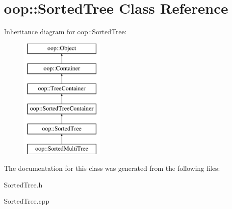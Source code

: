 \hypertarget{classoop_1_1SortedTree}{\section{oop\-:\-:\-Sorted\-Tree \-Class \-Reference}
\label{classoop_1_1SortedTree}
}
\-Inheritance diagram for oop\-:\-:\-Sorted\-Tree\-:\begin{figure}[H]
\begin{center}
\leavevmode
\includegraphics[height=6.000000cm]{classoop_1_1SortedTree}
\end{center}
\end{figure}


\-The documentation for this class was generated from the following files\-:\begin{DoxyCompactItemize}
\item 
\-Sorted\-Tree.\-h\item 
\-Sorted\-Tree.\-cpp\end{DoxyCompactItemize}
